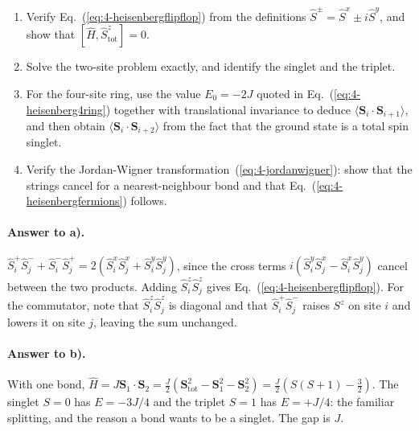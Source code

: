 \begin{enumerate}
  \item[a)] Verify Eq.~(\ref{eq:4-heisenbergflipflop}) from the definitions
  $\hat{S}^{\pm}=\hat{S}^x\pm i\hat{S}^y$, and show that
  $[\hat{H},\hat{S}^z_{\mathrm{tot}}]=0$.
  \item[b)] Solve the two-site problem exactly, and identify the singlet and
  the triplet.
  \item[c)] For the four-site ring, use the value $E_0=-2J$ quoted in
  Eq.~(\ref{eq:4-heisenberg4ring}) together with translational invariance to
  deduce $\langle\bm{S}_i\cdot\bm{S}_{i+1}\rangle$, and then obtain
  $\langle\bm{S}_i\cdot\bm{S}_{i+2}\rangle$ from the fact that the ground
  state is a total spin singlet.
  \item[d)] Verify the Jordan-Wigner
  transformation~(\ref{eq:4-jordanwigner}): show that the strings cancel for a
  nearest-neighbour bond and that Eq.~(\ref{eq:4-heisenbergfermions}) follows.
\end{enumerate}

\paragraph{Answer to a).}
$\hat{S}^+_i\hat{S}^-_j+\hat{S}^-_i\hat{S}^+_j
 = 2(\hat{S}^x_i\hat{S}^x_j+\hat{S}^y_i\hat{S}^y_j)$, since the cross terms
$i(\hat{S}^y_i\hat{S}^x_j-\hat{S}^x_i\hat{S}^y_j)$ cancel between the two
products.  Adding $\hat{S}^z_i\hat{S}^z_j$ gives
Eq.~(\ref{eq:4-heisenbergflipflop}).  For the commutator, note that
$\hat{S}^z_i\hat{S}^z_j$ is diagonal and that $\hat{S}^+_i\hat{S}^-_j$ raises
$S^z$ on site $i$ and lowers it on site $j$, leaving the sum unchanged.

\paragraph{Answer to b).}
With one bond, $\hat{H}=J\bm{S}_1\cdot\bm{S}_2
 = \tfrac{J}{2}\left(\bm{S}^2_{\mathrm{tot}}
   -\bm{S}^2_1-\bm{S}^2_2\right)
 = \tfrac{J}{2}\left(S(S+1)-\tfrac32\right)$.
The singlet $S=0$ has $E=-3J/4$ and the triplet $S=1$ has $E=+J/4$: the
familiar splitting, and the reason a bond wants to be a singlet.  The gap is
$J$.

